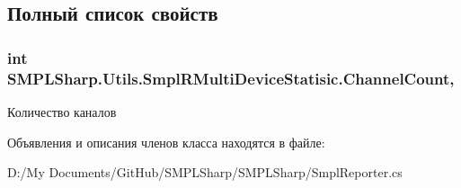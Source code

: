 \subsection{Полный список свойств}
\hypertarget{class_s_m_p_l_sharp_1_1_utils_1_1_smpl_r_multi_device_statisic_a918293b0514cc2084174138c94f3a56c}{
\subsubsection[{Channel\-Count}]{\setlength{\rightskip}{0pt plus 5cm}int S\-M\-P\-L\-Sharp.\-Utils.\-Smpl\-R\-Multi\-Device\-Statisic.\-Channel\-Count\hspace{0.3cm}{\ttfamily [get]}, {\ttfamily [set]}}}\label{de/d2e/class_s_m_p_l_sharp_1_1_utils_1_1_smpl_r_multi_device_statisic_a918293b0514cc2084174138c94f3a56c}


Количество каналов 



Объявления и описания членов класса находятся в файле\-:\begin{DoxyCompactItemize}
\item 
D\-:/\-My Documents/\-Git\-Hub/\-S\-M\-P\-L\-Sharp/\-S\-M\-P\-L\-Sharp/Smpl\-Reporter.\-cs\end{DoxyCompactItemize}
